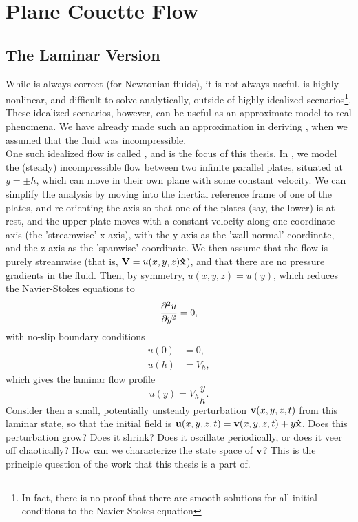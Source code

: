 \section{Plane Couette Flow}
\subsection{The Laminar Version}
While  is always correct (for Newtonian fluids), it is not always useful.  is highly nonlinear, and difficult to solve analytically, outside of highly idealized scenarios\footnote{In fact, there is no proof that there are smooth solutions for all initial conditions to the Navier-Stokes equation}. These idealized scenarios, however, can be useful as an approximate model to real phenomena. We have already made such an approximation in deriving , when we assumed that the fluid was incompressible. \\

One such idealized flow is called {\bf \pCf}, and is the focus of this thesis. In \pCf, we model the (steady) incompressible flow between two infinite parallel plates, situated at $y = \pm h$, which can move in their own plane with some constant velocity. We can simplify the analysis by moving into the inertial reference frame of one of the plates, and re-orienting the axis so that one of the plates (say, the lower) is at rest, and the upper plate moves with a constant velocity along one coordinate axis (the 'streamwise' x-axis), with the y-axis as the 'wall-normal' coordinate, and the z-axis as the 'spanwise' coordinate. We then assume that the flow is purely streamwise (that is, $\mathbf{V} = u(x,y,z)\mathbf{\hat{x}}$), and that there are no pressure gradients in the fluid. Then, by symmetry, $u(x,y,z) = u(y)$, which reduces the Navier-Stokes equations to 
\begin{equation}
\pder{2}{u}{y} = 0,
\end{equation}
with no-slip boundary conditions 
\begin{align}
u(0) &= 0,\\
u(h) &= V_h,
\end{align}
which gives the laminar flow profile 
\begin{equation}
u(y) = V_h\frac{y}{h}.
\end{equation}
Consider then a small, potentially unsteady perturbation $\mathbf{v}(x,y,z,t)$ from this laminar state, so that the initial field is $\mathbf{u}(x,y,z,t) = \mathbf{v} (x,y,z,t)+ y\mathbf{\hat{x}}$. Does this perturbation grow? Does it shrink? Does it oscillate periodically, or does it veer off chaotically? How can we characterize the state space of $\mathbf{v}$? This is the principle question of the work that this thesis is a part of. \\

